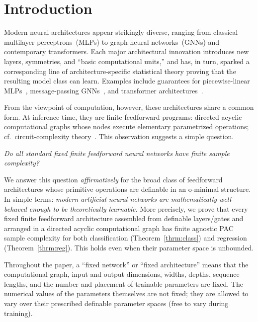 \documentclass{article}
\theoremstyle{plain}
\theoremstyle{definition}
\theoremstyle{remark}
\theoremstyle{plain}
\numberwithin{thm}{section}
\theoremstyle{definition}
\numberwithin{equation}{section}
\begin{document}
\section{Introduction}
\label{s:Intro}

Modern neural architectures appear strikingly diverse, ranging from classical multilayer perceptrons~(MLPs) to graph neural networks~(GNNs) and contemporary transformers.  Each major architectural innovation introduces new layers, symmetries, and ``basic computational units,'' and has, in turn, sparked a corresponding line of architecture-specific statistical theory proving that the resulting model class can learn. Examples include guarantees for piecewise-linear MLPs~\citep{bartlett2019nearly}, message-passing GNNs~\citep{GargJegelkaJaakkola2020,MorrisGeertsTonshoffGrohe2023}, and transformer architectures~\citep{EdelmanGoelKakadeZhang2022,TraugerTewari2024,limmer2024higher}.

From the viewpoint of computation, however, these architectures share a common form.  At inference time, they are finite feedforward programs: directed acyclic computational graphs whose nodes execute elementary parametrized operations; cf.\ circuit-complexity theory~\citep{JunkaBooleanBook,jukna2023tropical,MR3308677}.  This observation suggests a simple question.

\begin{questionbox}
\centering
\emph{Do all standard fixed finite feedforward neural networks have finite sample complexity?}
\end{questionbox}

We answer this question \emph{affirmatively} for the broad class of feedforward architectures whose primitive operations are definable in an o-minimal structure. In simple terms: \textit{modern artificial neural networks are mathematically well-behaved enough to be theoretically learnable.} More precisely, we prove that every fixed finite feedforward architecture assembled from definable layers/gates and arranged in a directed acyclic computational graph has finite agnostic PAC sample complexity for both classification (Theorem~\ref{thrm:class}) and regression (Theorem~\ref{thrm:reg}). This holds even when their parameter space is unbounded.  

Throughout the paper, a ``fixed network'' or ``fixed architecture'' means that the computational graph, input and output dimensions, widths, depths, sequence lengths, and the number and placement of trainable parameters are fixed. The numerical values of the parameters themselves are not fixed; they are allowed to vary over their prescribed definable parameter spaces (free to vary during training).
\end{document}
